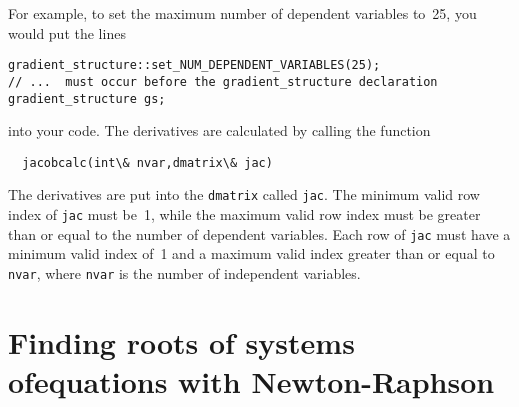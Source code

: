 \documentclass{admbmanual}
\begin{document}
For example, to set the maximum number of dependent variables to~25,
you would put the lines 
\begin{lstlisting}
gradient_structure::set_NUM_DEPENDENT_VARIABLES(25);
// ...  must occur before the gradient_structure declaration 
gradient_structure gs;
\end{lstlisting}
into your code.
The  derivatives  are calculated by calling the function
\begin{lstlisting}
  jacobcalc(int\& nvar,dmatrix\& jac)
\end{lstlisting}

The derivatives
are put into the \texttt{dmatrix} called \texttt{jac}. The minimum valid row index
of \texttt{jac} must be~1, while the maximum valid row index must
be greater than or equal to the number of dependent variables.
Each row of \texttt{jac} must have a minimum valid index of~1
and a maximum valid index greater than or equal to \texttt{nvar},
where \texttt{nvar} is the number of independent variables.




\section {Finding roots of systems of\br equations with Newton-Raphson}
\label{sec:finding-roots}
\end{document}
